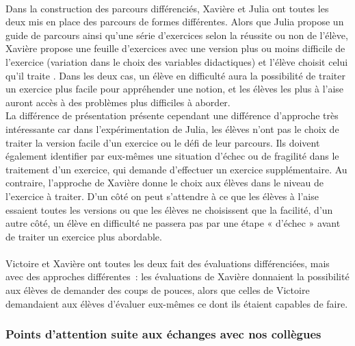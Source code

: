 \paragraph*{}Dans la construction des parcours différenciés, Xavière et Julia ont toutes les deux mis en place des parcours de formes différentes. Alors que Julia propose un guide de parcours ainsi qu'une série d'exercices selon la réussite ou non de l'élève, Xavière propose une feuille d'exercices avec une version plus ou moins difficile de l'exercice (variation dans le choix des variables didactiques) et l'élève choisit celui qu'il traite . Dans les deux cas, un élève en difficulté aura la possibilité de traiter un exercice plus facile pour appréhender une notion, et les élèves les plus à l'aise auront accès à des problèmes plus difficiles à aborder.\\
La différence de présentation présente cependant une différence d'approche très intéressante car dans l'expérimentation de Julia, les élèves n'ont pas le choix de traiter la version facile d'un exercice ou le défi de leur parcours. Ils doivent également identifier par eux-mêmes une situation d'échec ou de fragilité dans le traitement d'un exercice, qui demande d'effectuer un exercice supplémentaire. Au contraire, l'approche de Xavière donne le choix aux élèves dans le niveau de l'exercice à traiter. D'un côté on peut s'attendre à ce que les élèves à l'aise essaient toutes les versions ou que les élèves ne choisissent que la facilité, d'un autre côté, un élève en difficulté ne passera pas par une étape « d'échec » avant de traiter un exercice plus abordable.
\paragraph*{}
Victoire et Xavière ont toutes les deux fait des évaluations différenciées, mais avec des approches différentes : les évaluations de Xavière donnaient la possibilité aux élèves de demander des coups de pouces, alors que celles de Victoire demandaient aux élèves d'évaluer eux-mêmes ce dont ils étaient capables de faire.
\subsubsection{Points d'attention suite aux échanges avec nos collègues}\label{retour_collegues}
